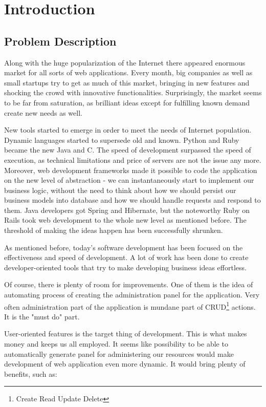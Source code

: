 
\chapter{Introduction}
  \section{Problem Description}
  Along with the huge popularization of the Internet there appeared enormous market for all sorts of web applications. Every month, big companies as well as small startups try to get as much of this market, bringing in new features and shocking the crowd with innovative functionalities. Surprisingly, the market seems to be far from saturation, as brilliant ideas except for fulfilling known demand create new needs as well.

  New tools started to emerge in order to meet the needs of Internet population. Dynamic languages started to supersede old and known. Python and Ruby became the new Java and C. The speed of development surpassed the speed of execution, as technical limitations and price of servers are not the issue any more. Moreover, web development frameworks made it possible to code the application on the new level of abstraction - we can instantaneously start to implement our business logic, without the need to think about how we should persist our business models into database and how we should handle requests and respond to them. Java developers got Spring and Hibernate, but the noteworthy Ruby on Rails took web development to the whole new level as mentioned before. The threshold of making the ideas happen has been successfully shrunken.
  
  As mentioned before, today's software development has been focused on the effectiveness and speed of development. A lot of work has been done to create developer-oriented tools that try to make developing business ideas effortless.
  
  Of course, there is plenty of room for improvements. One of them is the idea of automating process of creating the administration panel for the application. Very often administration part of the application is mundane part of CRUD\footnote{Create Read Update Delete} actions. It is the "must do" part. 
  
   User-oriented features is the target thing of development. This is what makes money and keeps us all employed. It seems like possibility to be able to automatically generate panel for administering our resources would make development of web application even more dynamic. It would bring plenty of benefits, such as:
  
